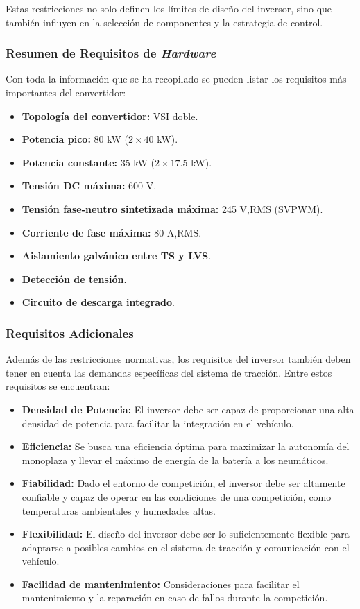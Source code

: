 Estas restricciones no solo definen los límites de diseño del inversor, sino que también influyen en la selección de componentes y la estrategia de control.

\subsubsection{Resumen de Requisitos de \textit{Hardware}}

Con toda la información que se ha recopilado se pueden listar los requisitos más importantes del convertidor:
\begin{itemize}
	\item \textbf{Topología del convertidor:} VSI doble.
	\item \textbf{Potencia pico:} 80 kW ($2\times40$ kW).
	\item \textbf{Potencia constante:} 35 kW ($2\times17.5$ kW).
	\item \textbf{Tensión DC máxima:} 600 V.
	\item \textbf{Tensión fase-neutro sintetizada máxima:} 245 V,RMS (SVPWM).
	\item \textbf{Corriente de fase máxima:} 80 A,RMS.
	\item \textbf{Aislamiento galvánico entre TS y LVS}.
	\item \textbf{Detección de tensión}.
	\item \textbf{Circuito de descarga integrado}.
	
	
\end{itemize}

\subsubsection{Requisitos Adicionales}
Además de las restricciones normativas, los requisitos del inversor también deben tener en cuenta las demandas específicas del sistema de tracción. Entre estos requisitos se encuentran:

\begin{itemize}
	\item \textbf{Densidad de Potencia:} El inversor debe ser capaz de proporcionar una alta densidad de potencia para facilitar la integración en el vehículo.
	\item \textbf{Eficiencia:} Se busca una eficiencia óptima para maximizar la autonomía del monoplaza y llevar el máximo de energía de la batería a los neumáticos.
	\item \textbf{Fiabilidad:} Dado el entorno de competición, el inversor debe ser altamente confiable y capaz de operar en las condiciones de una competición, como temperaturas ambientales y humedades altas.
	\item \textbf{Flexibilidad:} El diseño del inversor debe ser lo suficientemente flexible para adaptarse a posibles cambios en el sistema de tracción y comunicación con el vehículo.
	\item \textbf{Facilidad de mantenimiento:} Consideraciones para facilitar el mantenimiento y la reparación en caso de fallos durante la competición.
\end{itemize}

